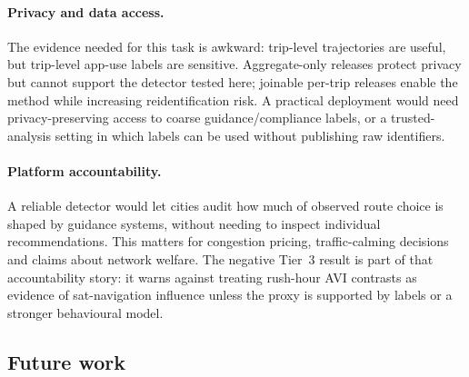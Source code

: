 \paragraph{Privacy and data access.} The evidence needed for this task is
awkward: trip-level trajectories are useful, but trip-level app-use labels
are sensitive. Aggregate-only releases protect privacy but cannot support
the detector tested here; joinable per-trip releases enable the method
while increasing reidentification risk. A practical deployment would need
privacy-preserving access to coarse guidance/compliance labels, or a
trusted-analysis setting in which labels can be used without publishing
raw identifiers.

\paragraph{Platform accountability.} A reliable detector would let cities
audit how much of observed route choice is shaped by guidance systems,
without needing to inspect individual recommendations. This matters for
congestion pricing, traffic-calming decisions and claims about network
welfare. The negative Tier~3 result is part of that accountability story:
it warns against treating rush-hour AVI contrasts as evidence of
sat-navigation influence unless the proxy is supported by labels or a
stronger behavioural model.

\subsection{Future work}
\label{sec:disc-future}

